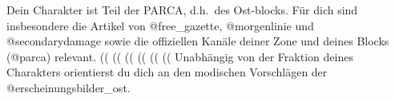 Dein Charakter ist Teil der PARCA, d.h.~des Ost-blocks. Für dich sind
insbesondere die Artikel von 
@free\_gazette, @morgenlinie und @secondarydamage sowie die offiziellen Kanäle
deiner Zone und deines Blocks (@parca) relevant.\absatz
%
((%
  ((%
    \absatz
  ((%
    \absatz
  ((%
((%
  \absatz
((%
%
Unabhängig von der Fraktion deines Charakters orientierst du dich an den
modischen Vorschlägen der @erscheinungsbilder\_ost. 

